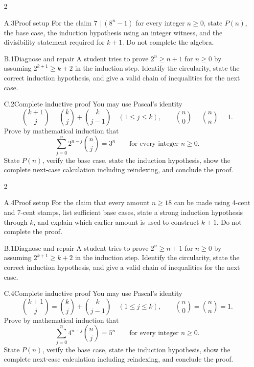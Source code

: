 \documentclass[9pt]{extarticle}
\begin{document}
\CoreWorkArea
\FormBreak
{}
\begin{multicols}{2}
\begin{CompactCoreProblem}{A.3}{Proof setup}
For the claim $7\mid(8^n-1)$ for every integer $n\ge0$, state $P(n)$, the base case, the induction hypothesis using an integer witness, and the divisibility statement required for $k+1$. Do not complete the algebra.
\end{CompactCoreProblem}
\begin{CompactCoreProblem}{B.1}{Diagnose and repair}
A student tries to prove $2^n\ge n+1$ for $n\ge0$ by assuming $2^{k+1}\ge k+2$ in the induction step. Identify the circularity, state the correct induction hypothesis, and give a valid chain of inequalities for the next case.
\end{CompactCoreProblem}
\end{multicols}
\begin{CompactCoreProblem}{C.2}{Complete inductive proof}
You may use Pascal's identity
\[
\binom{k+1}{j}=\binom{k}{j}+\binom{k}{j-1}
\quad(1\le j\le k),\qquad
\binom{n}{0}=\binom{n}{n}=1.
\]
Prove by mathematical induction that
\[
\sum_{j=0}^{n} 2^{n-j}\binom{n}{j}=3^n\qquad\text{for every integer }n\ge0.
\]
State $P(n)$, verify the base case, state the induction hypothesis, show the complete next-case calculation including reindexing, and conclude the proof.
\end{CompactCoreProblem}
\CoreWorkArea
\FormBreak
{}
\begin{multicols}{2}
\begin{CompactCoreProblem}{A.4}{Proof setup}
For the claim that every amount $n\ge18$ can be made using 4-cent and 7-cent stamps, list sufficient base cases, state a strong induction hypothesis through $k$, and explain which earlier amount is used to construct $k+1$. Do not complete the proof.
\end{CompactCoreProblem}
\begin{CompactCoreProblem}{B.1}{Diagnose and repair}
A student tries to prove $2^n\ge n+1$ for $n\ge0$ by assuming $2^{k+1}\ge k+2$ in the induction step. Identify the circularity, state the correct induction hypothesis, and give a valid chain of inequalities for the next case.
\end{CompactCoreProblem}
\end{multicols}
\begin{CompactCoreProblem}{C.4}{Complete inductive proof}
You may use Pascal's identity
\[
\binom{k+1}{j}=\binom{k}{j}+\binom{k}{j-1}
\quad(1\le j\le k),\qquad
\binom{n}{0}=\binom{n}{n}=1.
\]
Prove by mathematical induction that
\[
\sum_{j=0}^{n} 4^{n-j}\binom{n}{j}=5^n\qquad\text{for every integer }n\ge0.
\]
State $P(n)$, verify the base case, state the induction hypothesis, show the complete next-case calculation including reindexing, and conclude the proof.
\end{CompactCoreProblem}
\end{document}
